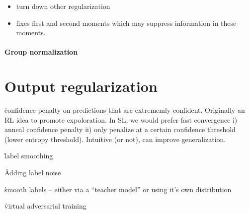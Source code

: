 


\begin{itemize}[noitemsep,topsep=0pt]
	\item turn down other regularization
	\item fixes first and second moments which may suppress information in these moments.
\end{itemize}



\paragraph{Group normalization}



\section{Output regularization}

\r{confidence penalty on predictions that are extrememly confident\cite{pereyra2017regularizing}. Originally an RL idea to promote expoloration. In SL, we would prefer fast convergence i) anneal confidence penalty ii) only penalize at a certain confidence threshold (lower entropy threshold). Intuitive (or not), can improve generalization.}

\r{label smoothing\cite{szegedy2016rethinking}}

\r{Adding label noise\cite{xie2016disturblabel}}

\r{smooth labels -- either via a ``teacher model''\cite{hinton2015distilling} or using it's own distribution\cite{reed2014training}}

\r{virtual adversarial training\cite{miyato2018virtual}}